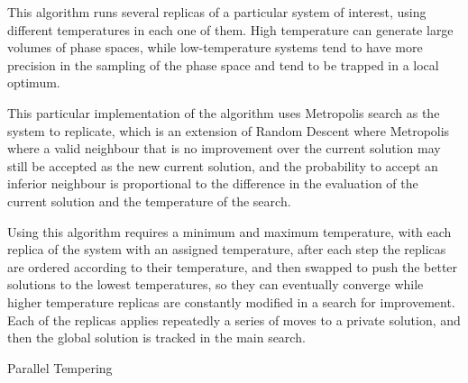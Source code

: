This algorithm runs several replicas of a particular system of interest, using different temperatures in each one of them. High temperature can generate large volumes of phase spaces, while low-temperature systems tend to have more precision in the sampling of the phase space and tend to be trapped in a local optimum.

This particular implementation of the algorithm uses Metropolis search as the system to replicate, which is an extension of Random Descent where Metropolis where a valid neighbour that is no improvement over the current solution may still be accepted as the new current solution, and the probability to accept an inferior neighbour is proportional to the difference in the evaluation of the current solution and the temperature of the search.

Using this algorithm requires a minimum and maximum temperature, with each replica of the system with an assigned temperature, after each step the replicas are ordered according to their temperature, and then swapped to push the better solutions to the lowest temperatures, so they can eventually converge while higher temperature replicas are constantly modified in a search for improvement. Each of the replicas applies repeatedly a series of moves to a private solution, and then the global solution is tracked in the main search.
\begin{algorithm}[H]
\label{parallel_temp_alg}
\caption{Parallel Tempering}
\SetAlgoLined
{}
\end{algorithm}

